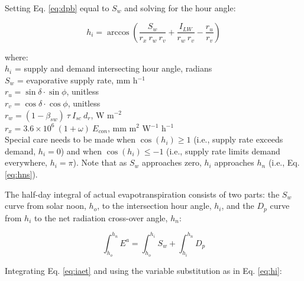\noindent Setting Eq. \ref{eq:dpb} equal to $S_w$ and solving for the hour angle:

\begin{equation}
\label{eq:hi}
	h_i = \arccos \left( \frac{S_w}{r_x\: r_w\: r_v}
	                   + \frac{I_{LW}}{r_w\: r_v}
	                   - \frac{r_u}{r_v} \right)
\end{equation}

\noindent where:\\
\indent $h_i$ = supply and demand intersecting hour angle, radians\\
\indent $S_w$ = evaporative supply rate, mm h$^{-1}$\\
\indent $r_u = \sin\delta\cdot\sin\phi$, unitless \\
\indent $r_v = \cos\delta\cdot\cos\phi$, unitless \\
\indent $r_w = \left(1-\beta_{sw}\right)\: \tau\: I_{sc}\: d_r$, W m$^{-2}$\\
\indent $r_x = 3.6\times10^6\: \left(1 + \omega \right)\: E_{con}$, mm m$^{2}$ W$^{-1}$ h$^{-1}$\\

\noindent Special care needs to be made when $\cos\left( h_i\right) \geq 1$ (i.e., supply rate exceeds demand, $h_i = 0$) and when $\cos\left( h_i\right) \leq -1$ (i.e., supply rate limits demand everywhere, $h_i = \pi$). Note that as $S_w$ approaches zero, $h_i$ approaches $h_n$ (i.e., Eq. \ref{eq:hns}).

The half-day integral of actual evapotranspiration consists of two parts: the $S_w$ curve from solar noon, $h_o$, to the intersection hour angle, $h_i$, and the $D_p$ curve from $h_i$ to the net radiation cross-over angle, $h_n$:

\begin{equation}
\label{eq:iaet}
	\int_{h_o}^{h_n} E^a = \int_{h_o}^{h_i} S_w + \int_{h_i}^{h_n} D_p
\end{equation}

Integrating Eq. \ref{eq:iaet} and using the variable substitution as in Eq. \ref{eq:hi}:

